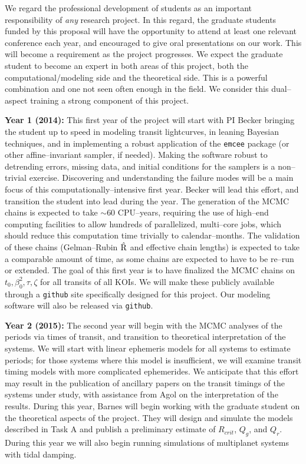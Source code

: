 We regard the professional development of students as an important
responsibility of {\it any} research project.  In this regard, the
graduate students funded by this proposal will have the opportunity to
attend at least one relevant conference each year, and encouraged to
give oral presentations on our work.  This will become a requirement
as the project progresses.  We expect the graduate student to become
an expert in both areas of this project, both the
computational/modeling side and the theoretical side.  This is a
powerful combination and one not seen often enough in the field.  We
consider this dual--aspect training a strong component of this
project.

{\bf Year 1 (2014):} This first year of the project will start with PI
Becker bringing the student up to speed in modeling transit
lightcurves, in leaning Bayesian techniques, and in implementing a
robust application of the {\tt emcee} package (or other
affine--invariant sampler, if needed).  Making the software robust to
detrending errors, missing data, and initial conditions for the
samplers is a non--trivial exercise.  Discovering and understanding
the failure modes will be a main focus of this
computationally--intensive first year.  Becker will lead this effort,
and transition the student into lead during the year.  The generation
of the MCMC chains is expected to take $\sim 60$ CPU--years, requiring
the use of high--end computing facilities to allow hundreds of
parallelized, multi--core jobs, which should reduce this computation
time trivially to calendar--months. The validation of these chains
(Gelman--Rubin $\hat{\rm R}$ and effective chain lengths) is expected
to take a comparable amount of time, as some chains are expected to
have to be re--run or extended.  The goal of this first year is to
have finalized the MCMC chains on $t_0, \beta_0^2, \tau, \zeta$ for
all transits of all KOIs.  We will make these publicly available
through a {\tt github} site specifically designed for this project.
Our modeling software will also be released via {\tt github}.

{\bf Year 2 (2015):} The second year will begin with the MCMC analyses
of the periods via times of transit, and transition to theoretical
interpretation of the systems.  We will start with linear ephemeris
models for all systems to estimate periods; for those systems where
this model is insufficient, we will examine transit timing models with
more complicated ephemerides.  We anticipate that this effort may
result in the publication of ancillary papers on the transit timings
of the systems under study, with assistance from Agol on the
interpretation of the results. During this year, Barnes will begin
working with the graduate student on the theoretical aspects of the
project. They will design and simulate the models described in Task A
and publish a preliminary estimate of $R_{crit}$, $Q_g$, and
$Q_r$. During this year we will also begin running simulations of
multiplanet systems with tidal damping.

